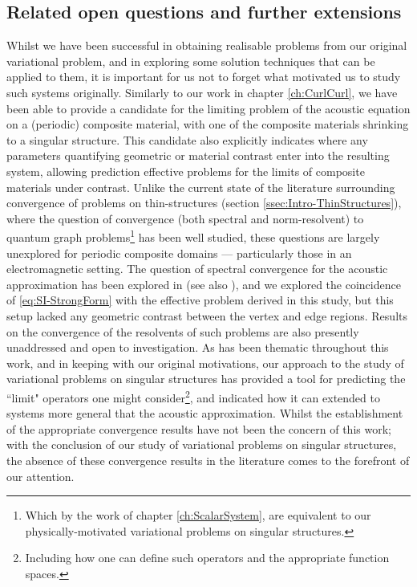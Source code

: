 \subsection{Related open questions and further extensions}
Whilst we have been successful in obtaining realisable problems from our original variational problem, and in exploring some solution techniques that can be applied to them, it is important for us not to forget what motivated us to study such systems originally.
Similarly to our work in chapter \ref{ch:CurlCurl}, we have been able to provide a candidate for the limiting problem of the acoustic equation on a (periodic) composite material, with one of the composite materials shrinking to a singular structure.
This candidate also explicitly indicates where any parameters quantifying geometric or material contrast enter into the resulting system, allowing prediction effective problems for the limits of composite materials under contrast.
Unlike the current state of the literature surrounding convergence of problems on thin-structures (section \ref{ssec:Intro-ThinStructures}), where the question of convergence (both spectral and norm-resolvent) to quantum graph problems\footnote{Which by the work of chapter \ref{ch:ScalarSystem}, are equivalent to our physically-motivated variational problems on singular structures.} has been well studied, these questions are largely unexplored for periodic composite domains --- particularly those in an electromagnetic setting.
The question of spectral convergence for the acoustic approximation has been explored in \cite{figotin1998spectral} (see also \cite[section 7.5]{kuchment2001mathematics}), and we explored the coincidence of \eqref{eq:SI-StrongForm} with the effective problem derived in this study, but this setup lacked any geometric contrast between the vertex and edge regions.
Results on the convergence of the resolvents of such problems are also presently unaddressed and open to investigation.
As has been thematic throughout this work, and in keeping with our original motivations, our approach to the study of variational problems on singular structures has provided a tool for predicting the ``limit" operators one might consider\footnote{Including how one can define such operators and the appropriate function spaces.}, and indicated how it can extended to systems more general that the acoustic approximation.
Whilst the establishment of the appropriate convergence results have not been the concern of this work; with the conclusion of our study of variational problems on singular structures, the absence of these convergence results in the literature comes to the forefront of our attention.

